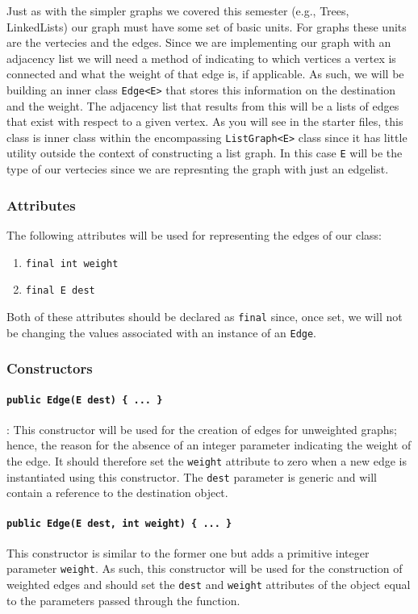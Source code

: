 Just as with the simpler graphs we covered this semester (e.g., Trees,
LinkedLists) our graph must have some set of basic units.  For graphs these
units are the vertecies and the edges. Since we are implementing our graph with
an adjacency list we will need a method of indicating to which vertices a
vertex is connected and what the weight of that edge is, if applicable.  As
such, we will be building an inner class \lstinline|Edge<E>| that stores this
information on the destination and the weight. The adjacency list that results 
from this will be a lists of edges that exist with respect to a given vertex. 
As you will see in the starter files, this class is inner class within the 
encompassing \lstinline|ListGraph<E>| class since it has little utility
outside the context of constructing a list graph. In this case \lstinline|E|
will be the type of our vertecies since we are represnting the graph with
just an edgelist.

\subsubsection{Attributes}

The following attributes will be used for representing the edges of our class:
\begin{enumerate}
    \item \lstinline|final int weight|
    \item \lstinline|final E dest|  
\end{enumerate}
Both of these attributes should be declared as \lstinline|final| since, once
set, we will not be changing the values associated with an instance of an
\lstinline|Edge|.

\subsubsection{Constructors}

\paragraph{\lstinline|public Edge(E dest) { ... }|}: This constructor will be
used for the creation of edges for unweighted graphs; hence, the reason for the
absence of an integer parameter indicating the weight of the edge. It should
therefore set the \lstinline|weight| attribute to zero when a new edge is
instantiated using this constructor. The \lstinline|dest| parameter is generic
and will contain a reference to the destination object.

\paragraph{\lstinline|public Edge(E dest, int weight) { ... }|} This
constructor is similar to the former one but adds a primitive integer parameter
\lstinline|weight|. As such, this constructor will be used for the construction
of weighted edges and should set the \lstinline|dest| and \lstinline|weight| 
attributes of the object equal to the parameters passed through the function.
